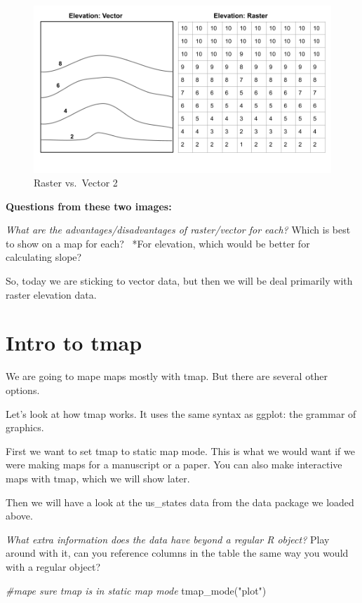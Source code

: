 \documentclass[
]{book}
\newenvironment{Shaded}{\begin{snugshade}}{\end{snugshade}}
\newcommand{\CommentTok}[1]{\textcolor[rgb]{0.56,0.35,0.01}{\textit{#1}}}
\newcommand{\FunctionTok}[1]{\textcolor[rgb]{0.00,0.00,0.00}{#1}}
\newcommand{\NormalTok}[1]{#1}
\newcommand{\StringTok}[1]{\textcolor[rgb]{0.31,0.60,0.02}{#1}}
\begin{document}
\begin{figure}
\centering
\includegraphics{images/raster vector2.png}
\caption{Raster vs.~Vector 2}
\end{figure}

\textbf{Questions from these two images:}

\emph{What are the advantages/disadvantages of raster/vector for each?} Which is best to show on a map for each?~ *For elevation, which would be better for calculating slope?~

So, today we are sticking to vector data, but then we will be deal primarily with raster elevation data.

\hypertarget{intro-to-tmap}{%
\section{Intro to tmap}\label{intro-to-tmap}}

We are going to mape maps mostly with tmap. But there are several other options.

Let's look at how tmap works. It uses the same syntax as ggplot: the grammar of graphics.

First we want to set tmap to static map mode. This is what we would want if we were making maps for a manuscript or a paper. You can also make interactive maps with tmap, which we will show later.

Then we will have a look at the us\_states data from the data package we loaded above.

\emph{What extra information does the data have beyond a regular R object?} Play around with it, can you reference columns in the table the same way you would with a regular object?

\begin{Shaded}
\begin{Highlighting}[]
\CommentTok{\#mape sure tmap is in static map mode}
\FunctionTok{tmap\_mode}\NormalTok{(}\StringTok{"plot"}\NormalTok{)}
\end{Highlighting}
\end{Shaded}
\end{document}
